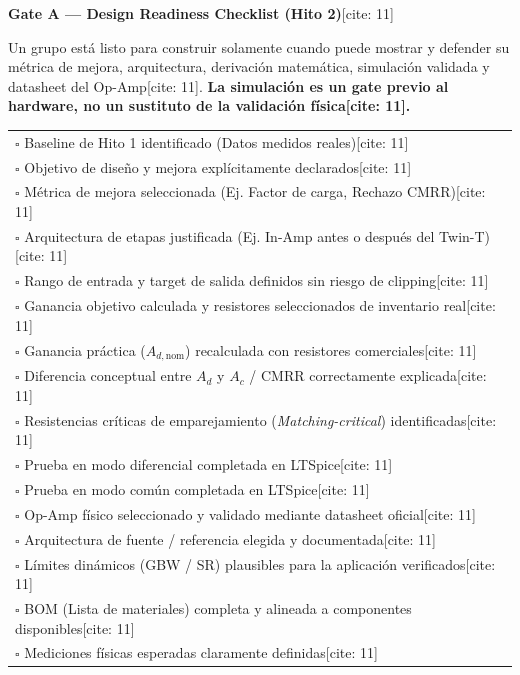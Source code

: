 \documentclass[11pt, a4paper]{article}
\begin{document}
\begin{center}
    \Large\textbf{\textcolor{ucbblue}{Gate A — Design Readiness Checklist (Hito 2)}}[cite: 11]
\end{center}

\begin{tcolorbox}[colback=white, colframe=black, title=\textbf{Definición del Gate A[cite: 11]}]
    \raggedright
    Un grupo está listo para construir solamente cuando puede mostrar y defender su métrica de mejora, arquitectura, derivación matemática, simulación validada y datasheet del Op-Amp[cite: 11]. \textbf{La simulación es un gate previo al hardware, no un sustituto de la validación física[cite: 11].}
\end{tcolorbox}

\vspace{0.4cm}
\begin{tabularx}{\textwidth}{X}
    $\square$ Baseline de Hito 1 identificado (Datos medidos reales)[cite: 11] \\
    $\square$ Objetivo de diseño y mejora explícitamente declarados[cite: 11] \\
    $\square$ Métrica de mejora seleccionada (Ej. Factor de carga, Rechazo CMRR)[cite: 11] \\
    $\square$ Arquitectura de etapas justificada (Ej. In-Amp antes o después del Twin-T)[cite: 11] \\
    $\square$ Rango de entrada y target de salida definidos sin riesgo de clipping[cite: 11] \\
    $\square$ Ganancia objetivo calculada y resistores seleccionados de inventario real[cite: 11] \\
    $\square$ Ganancia práctica ($A_{d,\mathrm{nom}}$) recalculada con resistores comerciales[cite: 11] \\
    $\square$ Diferencia conceptual entre $A_d$ y $A_c$ / CMRR correctamente explicada[cite: 11] \\
    $\square$ Resistencias críticas de emparejamiento (\textit{Matching-critical}) identificadas[cite: 11] \\
    $\square$ Prueba en modo diferencial completada en LTSpice[cite: 11] \\
    $\square$ Prueba en modo común completada en LTSpice[cite: 11] \\
    $\square$ Op-Amp físico seleccionado y validado mediante datasheet oficial[cite: 11] \\
    $\square$ Arquitectura de fuente / referencia elegida y documentada[cite: 11] \\
    $\square$ Límites dinámicos (GBW / SR) plausibles para la aplicación verificados[cite: 11] \\
    $\square$ BOM (Lista de materiales) completa y alineada a componentes disponibles[cite: 11] \\
    $\square$ Mediciones físicas esperadas claramente definidas[cite: 11] \\
\end{tabularx}
\end{document}
